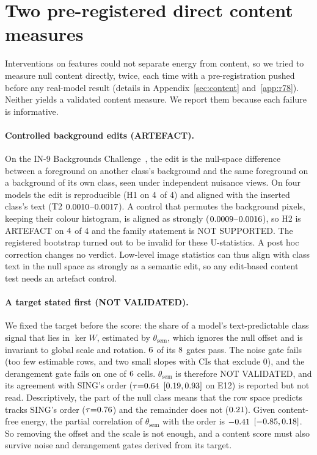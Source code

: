 \documentclass[10pt]{article}
\begin{document}
\section{Two pre-registered direct content measures}
\label{sec:negatives}
Interventions on features could not separate energy from content, so we tried to measure null content directly, twice, each time with a pre-registration pushed before any real-model result (details in Appendix~\ref{sec:content} and~\ref{app:r78}). Neither yields a validated content measure. We report them because each failure is informative.

\paragraph{Controlled background edits (ARTEFACT).}
On the IN-9 Backgrounds Challenge~\citep{xiao2021backgrounds}, the edit is the null-space difference between a foreground on another class's background and the same foreground on a background of its own class, seen under independent nuisance views. On four models the edit is reproducible (H1 on $4$ of 4) and aligned with the inserted class's text (T2 $0.0010$--$0.0017$). A control that permutes the background pixels, keeping their colour histogram, is aligned as strongly ($0.0009$--$0.0016$), so H2 is ARTEFACT on $4$ of 4 and the family statement is NOT SUPPORTED. The registered bootstrap turned out to be invalid for these U-statistics. A post hoc correction changes no verdict. Low-level image statistics can thus align with class text in the null space as strongly as a semantic edit, so any edit-based content test needs an artefact control.

\paragraph{A target stated first (NOT VALIDATED).}
We fixed the target before the score: the share of a model's text-predictable class signal that lies in $\ker W$, estimated by $\theta_{\mathrm{sem}}$, which ignores the null offset and is invariant to global scale and rotation. $6$ of its $8$ gates pass. The noise gate fails (too few estimable rows, and two small slopes with CIs that exclude 0), and the derangement gate fails on one of $6$ cells. $\theta_{\mathrm{sem}}$ is therefore NOT VALIDATED, and its agreement with SING's order ($\tau{=}0.64$ $[0.19,0.93]$ on E12) is reported but not read. Descriptively, the part of the null class means that the row space predicts tracks SING's order ($\tau{=}0.76$) and the remainder does not ($0.21$). Given content-free energy, the partial correlation of $\theta_{\mathrm{sem}}$ with the order is ${-}0.41$ $[{-}0.85,0.18]$. So removing the offset and the scale is not enough, and a content score must also survive noise and derangement gates derived from its target.
\end{document}
